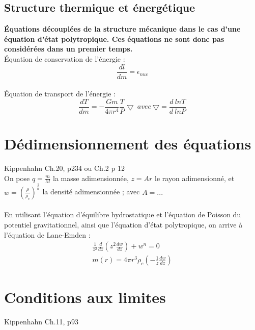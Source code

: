 \documentclass[a4paper,10pt]{article}
\begin{document}
\subsection{Structure thermique et énergétique}
\textbf{Équations découplées de la structure mécanique dans le cas d'une équation d'état polytropique. Ces équations ne sont donc pas considérées dans un premier temps.}\\
Équation de conservation de l'énergie :
\begin{equation}
\frac{d l}{d m}= \epsilon_{nuc}
\end{equation}
\\
Équation de transport de l'énergie :
\begin{equation}
\frac{d T}{d m}= - \frac{G m}{4 \pi r^4} \frac{T}{P} \bigtriangledown ~ avec ~ \bigtriangledown = \frac{d~ln T}{d~ln P}
\end{equation}

\newpage

\section{Dédimensionnement des équations}
Kippenhahn Ch.20, p234 ou Ch.2 p 12\\
On pose $q=\frac{m}{M}$ la masse adimensionnée, $z=A r$ le rayon adimensionné, et $w=(\frac{\rho}{\rho_c})^{\frac{1}{n}}$ la densité adimensionnée ; avec $A=...$ \\
\\
En utilisant l'équation d'équilibre hydrostatique et l'équation de Poisson du potentiel gravitationnel, ainsi que l'équation d'état polytropique, on arrive à l'équation de Lane-Emden :\\
\begin{eqnarray}
\frac{1}{z^2}\frac{d}{dz}(z^2 \frac{d w}{dz}) + w^n=0\\
m(r)=4 \pi r^3 \rho_c \left(- \frac{1}{z} \frac{dw}{dz}\right)
\end{eqnarray}

\section{Conditions aux limites}
Kippenhahn Ch.11, p93
\end{document}
